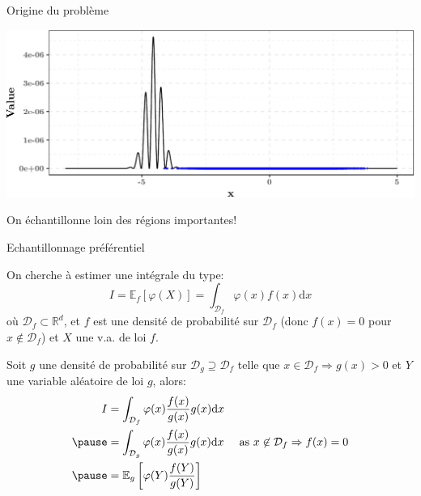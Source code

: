 \documentclass[ignorenonframetext,]{beamer}
\newcommand{\rmd}{\text{d}}
\newcommand{\R}{\mathbb{R}}
\begin{document}
\begin{frame}{Origine du problème}
\protect\hypertarget{origine-du-probluxe8me}{}

\includegraphics{diapos_importance_sampling_files/figure-beamer/plot_monte_carlo_samples-1.pdf}

On échantillonne loin des régions importantes!

\end{frame}

\begin{frame}{Echantillonnage préférentiel}
\protect\hypertarget{echantillonnage-pruxe9fuxe9rentiel-1}{}

On cherche à estimer une intégrale du type:
\[I = \mathbb{E}_f[\varphi(X)] = \int_{\mathcal{D}_f} \varphi(x) f(x)\rmd x \]
où \(\mathcal{D}_f \subset \R^d\), et \(f\) est une densité de
probabilité sur \(\mathcal{D}_f\) (donc \(f(x) = 0\) pour
\(x \not\in \mathcal{D}_f\)) et \(X\) une v.a. de loi \(f\). \pause

Soit \(g\) une densité de probabilité sur
\(\mathcal{D}_g \supseteq \mathcal{D}_f\) telle que
\(x\in \mathcal{D}_f \Rightarrow g(x) > 0\) et \(Y\) une variable
aléatoire de loi \(g\), alors: \begin{align*}
I &=  \int_{\mathcal{D}_f} \varphi(x) \frac{f(x)}{g(x)}g(x)\rmd x &\\ \pause
&= \int_{\mathcal{D}_g}  \varphi(x) \frac{f(x)}{g(x)}g(x)\rmd x & \text{ as } x \not\in \mathcal{D}_f \Rightarrow f(x) = 0\\ \pause
&= \mathbb{E}_g\left[\varphi(Y) \frac{f(Y)}{g(Y)}\right]&
\end{align*}

\end{frame}
\end{document}
